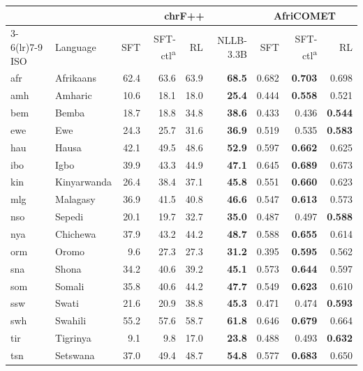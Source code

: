 \begin{table}[t]
\centering\footnotesize
\setlength{\tabcolsep}{3pt}
\begin{tabular}{@{}llrrrrrrr@{}}
\toprule
& & \multicolumn{4}{c}{chrF++} & \multicolumn{3}{c}{AfriCOMET} \\
\cmidrule(lr){3-6}\cmidrule(lr){7-9}
ISO & Language & SFT & SFT-ctl\textsuperscript{a} & RL & NLLB-3.3B & SFT & SFT-ctl\textsuperscript{a} & RL \\
\midrule
afr & Afrikaans & 62.4 & 63.6 & 63.9 & \textbf{68.5} & 0.682 & \textbf{0.703} & 0.698 \\
amh & Amharic & 10.6 & 18.1 & 18.0 & \textbf{25.4} & 0.444 & \textbf{0.558} & 0.521 \\
bem & Bemba & 18.7 & 18.8 & 34.8 & \textbf{38.6} & 0.433 & 0.436 & \textbf{0.544} \\
ewe & Ewe & 24.3 & 25.7 & 31.6 & \textbf{36.9} & 0.519 & 0.535 & \textbf{0.583} \\
hau & Hausa & 42.1 & 49.5 & 48.6 & \textbf{52.9} & 0.597 & \textbf{0.662} & 0.625 \\
ibo & Igbo & 39.9 & 43.3 & 44.9 & \textbf{47.1} & 0.645 & \textbf{0.689} & 0.673 \\
kin & Kinyarwanda & 26.4 & 38.4 & 37.1 & \textbf{45.8} & 0.551 & \textbf{0.660} & 0.623 \\
mlg & Malagasy & 36.9 & 41.5 & 40.8 & \textbf{46.6} & 0.547 & \textbf{0.613} & 0.573 \\
nso & Sepedi & 20.1 & 19.7 & 32.7 & \textbf{35.0} & 0.487 & 0.497 & \textbf{0.588} \\
nya & Chichewa & 37.9 & 43.2 & 44.2 & \textbf{48.7} & 0.588 & \textbf{0.655} & 0.614 \\
orm & Oromo & 9.6 & 27.3 & 27.3 & \textbf{31.2} & 0.395 & \textbf{0.595} & 0.562 \\
sna & Shona & 34.2 & 40.6 & 39.2 & \textbf{45.1} & 0.573 & \textbf{0.644} & 0.597 \\
som & Somali & 35.8 & 40.6 & 44.2 & \textbf{47.7} & 0.549 & \textbf{0.623} & 0.610 \\
ssw & Swati & 21.6 & 20.9 & 38.8 & \textbf{45.3} & 0.471 & 0.474 & \textbf{0.593} \\
swh & Swahili & 55.2 & 57.6 & 58.7 & \textbf{61.8} & 0.646 & \textbf{0.679} & 0.664 \\
tir & Tigrinya & 9.1 & 9.8 & 17.0 & \textbf{23.8} & 0.488 & 0.493 & \textbf{0.632} \\
tsn & Setswana & 37.0 & 49.4 & 48.7 & \textbf{54.8} & 0.577 & \textbf{0.683} & 0.650 \\

\end{tabular}
\end{table}

